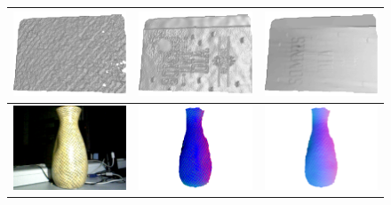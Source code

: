 \begin{figure}[!ht]
{\begin{tabular}{c|c c}
   \includegraphics[height = 0.22\linewidth]{figures/result/robust_folder_shape_init.pdf} 
   &
   \includegraphics[height = 0.22\linewidth]{figures/result/rgbd_folder_shape.pdf} &
   \includegraphics[height = 0.22\linewidth]{figures/result/robust_folder_shape.pdf}\\
\hline
   \includegraphics[height = 0.24\linewidth]{figures/result/robust_vase_rgb.pdf} 
   &
   \includegraphics[height = 0.24\linewidth]{figures/result/rgbd_vase_normal.pdf} &
   \includegraphics[height = 0.24\linewidth]{figures/result/robust_vase_normal.pdf} \\


\end{tabular}}
\end{figure}
